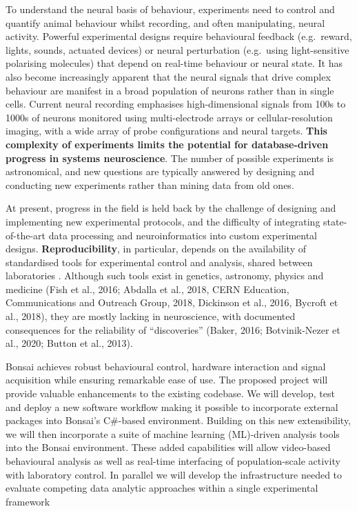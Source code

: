 To understand the neural basis of behaviour, experiments need to control and quantify animal behaviour whilst recording, and often manipulating, neural activity. 
%
Powerful experimental designs require behavioural feedback (e.g.\ reward, lights, sounds, actuated
devices) or neural perturbation (e.g.\ using light-sensitive polarising
molecules) that depend on real-time behaviour or neural state.
%
It has also become increasingly apparent that the neural signals that
drive complex behaviour are manifest in a broad population of neurons rather
than in single cells. Current neural recording emphasises high-dimensional
signals from 100s to 1000s of neurons monitored using multi-electrode arrays or cellular-resolution imaging, with a wide array of probe configurations and neural targets.
%
\textbf{This complexity of experiments limits the potential for database-driven progress in systems neuroscience}. The number of possible experiments is astronomical, and new questions are typically answered by designing and conducting new experiments rather than mining data from old ones.

At present, progress in the field is held back by the challenge of designing and implementing new experimental protocols, and the difficulty of integrating state-of-the-art data processing and neuroinformatics into custom experimental designs.
%
\textbf{Reproducibility}, in particular, depends on the availability of
standardised tools for experimental control and analysis, shared between
laboratories \citep{baker16,ioannidis05}. Although such tools exist in genetics, astronomy, physics and medicine (Fish et al., 2016; Abdalla et al., 2018, CERN Education, Communications and Outreach Group, 2018, Dickinson et al., 2016, Bycroft et al., 2018), they are mostly lacking in neuroscience, with documented consequences for the reliability of ``discoveries'' (Baker, 2016; Botvinik-Nezer et al., 2020; Button et al., 2013). 




Bonsai achieves robust behavioural control, hardware interaction and signal acquisition while ensuring remarkable ease of use.  The proposed project will provide valuable enhancements to the existing codebase.  We will develop, test and deploy a new software workflow making it possible to incorporate external packages into Bonsai's C\#-based environment.  Building on this new extensibility, we will then incorporate a suite of machine learning (ML)-driven analysis tools into the Bonsai environment.  These added capabilities will allow  video-based behavioural analysis as well as real-time interfacing of population-scale activity with laboratory control.  In parallel we will develop the infrastructure needed to evaluate competing data analytic approaches within a single experimental framework

